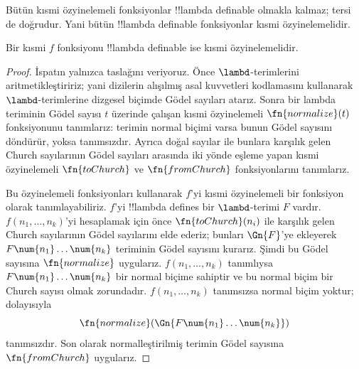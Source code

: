 


Bütün kısmi özyinelemeli fonksiyonlar !!{lambda definable} olmakla kalmaz;
tersi de doğrudur. Yani bütün !!{lambda definable} fonksiyonlar kısmi
özyinelemelidir.

\begin{thm}
   Bir kısmi $f$ fonksiyonu
  !!{lambda definable} ise kısmi özyinelemelidir.
\end{thm}

\begin{proof}
  İspatın yalnızca taslağını veriyoruz. Önce $\lambd$-terimlerini
  aritmetikleştiririz; yani dizilerin alışılmış asal kuvvetleri kodlamasını
  kullanarak $\lambd$-terimlerine dizgesel biçimde Gödel sayıları atarız.
  Sonra bir lambda teriminin Gödel sayısı $t$ üzerinde çalışan kısmi
  özyinelemeli $\fn{normalize}(t)$ fonksiyonunu tanımlarız: terimin normal
  biçimi varsa bunun Gödel sayısını döndürür, yoksa tanımsızdır. Ayrıca doğal
  sayılar ile bunlara karşılık gelen Church sayılarının Gödel sayıları
  arasında iki yönde eşleme yapan kısmi özyinelemeli $\fn{toChurch}$ ve
  $\fn{fromChurch}$ fonksiyonlarını tanımlarız.

  Bu özyinelemeli fonksiyonları kullanarak $f$'yi kısmi özyinelemeli bir
  fonksiyon olarak tanımlayabiliriz. $f$'yi !!{lambda define}s bir
  $\lambd$-terimi $F$ vardır. $f(n_1,\dots,n_k)$'yi hesaplamak için önce
  $\fn{toChurch}(n_i)$ ile karşılık gelen Church sayılarının Gödel sayılarını
  elde ederiz; bunları $\Gn{F}$'ye ekleyerek
  $F\num{n_1}\dots\num{n_k}$ teriminin Gödel sayısını kurarız. Şimdi bu
  Gödel sayısına $\fn{normalize}$ uygularız. $f(n_1,\dots,n_k)$ tanımlıysa
  $F\num{n_1}\dots\num{n_k}$ bir normal biçime sahiptir ve bu normal biçim
  bir Church sayısı olmak zorundadır. $f(n_1,\dots,n_k)$ tanımsızsa normal
  biçim yoktur; dolayısıyla
  \[
  \fn{normalize}(\Gn{F\num{n_1}\dots\num{n_k}})
  \]
  tanımsızdır. Son olarak normalleştirilmiş terimin Gödel sayısına
  $\fn{fromChurch}$ uygularız.
\end{proof}

